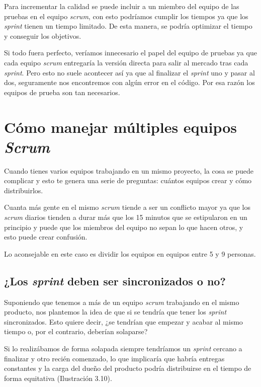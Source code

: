Para incrementar la calidad se puede incluir a un miembro del equipo de las pruebas en el equipo \textit{scrum}, con esto podríamos cumplir los tiempos ya que los \textit{sprint} tienen un tiempo limitado. De esta manera, se podría optimizar el tiempo y conseguir los objetivos.

Si todo fuera perfecto,  veríamos innecesario el papel del equipo de pruebas ya que cada equipo \textit{scrum} entregaría la versión directa para salir al mercado tras cada \textit{sprint}. Pero esto no suele acontecer así ya que al finalizar el \textit{sprint} uno y pasar al dos, seguramente nos encontremos con algún error en el código. Por esa razón los equipos de prueba son tan necesarios.

\section{Cómo manejar múltiples equipos \textit{Scrum}}

Cuando tienes varios equipos trabajando en un mismo proyecto, la cosa se puede complicar y esto te genera una serie de preguntas: cuántos equipos crear y cómo distribuirlos.

Cuanta más gente en el mismo \textit{scrum} tiende a ser un conflicto mayor ya que los \textit{scrum} diarios tienden a durar más que los 15 minutos que se estipularon en un principio y puede que los miembros del equipo no sepan lo que hacen otros, y esto puede crear confusión.

Lo aconsejable en este caso es dividir los equipos en equipos entre 5 y 9 personas.

\subsection{¿Los \textit{sprint} deben ser sincronizados o no?}

Suponiendo que tenemos a más de un equipo \textit{scrum} trabajando en el mismo producto, nos plantemos la idea de que si se tendría que tener los \textit{sprint} sincronizados. Esto quiere decir, ¿se tendrían que empezar y acabar al mismo tiempo o, por el contrario, deberían solaparse?

Si lo realizábamos de forma solapada siempre tendríamos un \textit{sprint} cercano a finalizar y otro  recién comenzado, lo que implicaría que habría entregas constantes y la carga del dueño del producto podría distribuirse en el tiempo de forma equitativa (Ilustración 3.10).


